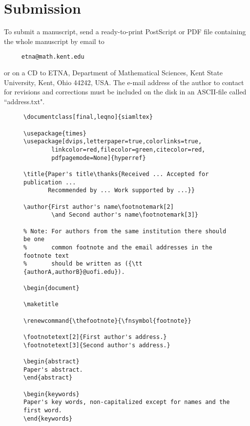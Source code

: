\documentclass[10pt]{article}
\begin{document}

\section{Submission}
To submit a manuscript, send a ready-to-print PostScript or PDF file containing
the whole manuscript by email to
%
\begin{verbatim}     etna@math.kent.edu\end{verbatim}
%
or on a CD to ETNA, Department of Mathematical Sciences, Kent State University,
Kent, Ohio 44242, USA. The e-mail address of the author to contact for revisions
and corrections must be included on the disk in an ASCII-file called ``address.txt".



\newpage
\begin{figure}
\begin{verbatim}
\documentclass[final,leqno]{siamltex}

\usepackage{times}
\usepackage[dvips,letterpaper=true,colorlinks=true,
        linkcolor=red,filecolor=green,citecolor=red,
        pdfpagemode=None]{hyperref}

\title{Paper's title\thanks{Received ... Accepted for publication ...
       Recommended by ... Work supported by ...}}

\author{First author's name\footnotemark[2]
        \and Second author's name\footnotemark[3]}

% Note: For authors from the same institution there should be one
%       common footnote and the email addresses in the footnote text
%       should be written as ({\tt {authorA,authorB}@uofi.edu}).

\begin{document}

\maketitle

\renewcommand{\thefootnote}{\fnsymbol{footnote}}

\footnotetext[2]{First author's address.}
\footnotetext[3]{Second author's address.}

\begin{abstract}
Paper's abstract.
\end{abstract}

\begin{keywords}
Paper's key words, non-capitalized except for names and the first word.
\end{keywords}


\end{verbatim}
\end{figure}
\end{document}
